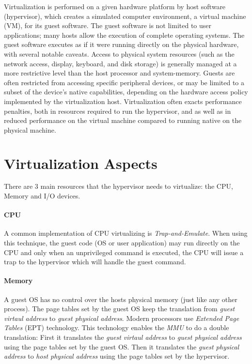 Virtualization is performed on a given hardware platform by host software (hypervisor), which creates a
simulated computer environment, a virtual machine (VM), for its guest software.
The guest software is not limited to user applications; many hosts allow the execution of complete operating
systems. The guest software executes as if it were running directly on the physical hardware, with several
notable caveats. Access to physical system resources (such as the network access, display, keyboard, and disk
storage) is generally managed at a more restrictive level than the host processor and system-memory. Guests are
often restricted from accessing specific peripheral devices, or may be limited to a subset of the device's
native capabilities, depending on the hardware access policy implemented by the virtualization host.
Virtualization often exacts performance penalties, both in resources required to run the hypervisor,
and as well as in reduced performance on the virtual machine compared to running native on the physical machine.


\section{Virtualization Aspects}
There are 3 main resources that the hypervisor needs to virtualize: the CPU, Memory and I/O devices.

\paragraph {CPU}
A common implementation of CPU virtualizing is \emph{Trap-and-Emulate}. When using this technique,
the guest code (OS or user application) may run directly on the CPU and only when an unprivileged command is
executed, the CPU will issue a trap to the hypervisor which will handle the guest command.

\paragraph {Memory}
A guest OS has no control over the hosts physical memory (just like any other process). The page tables set by the
guest OS keep the translation from \emph{guest virtaul address} to \emph{guest physical address}. Modern
processors use \emph{Extended Page Tables} (EPT) technology. This technology enables the \emph{MMU} to do a
double translation: First it translates the \emph{guest virtaul address} to \emph{guest physical address} using the page tables set by the guest OS. Then it translates the \emph{guest physical address} to \emph{host physical address} using the page tables set by the hypervisor.

